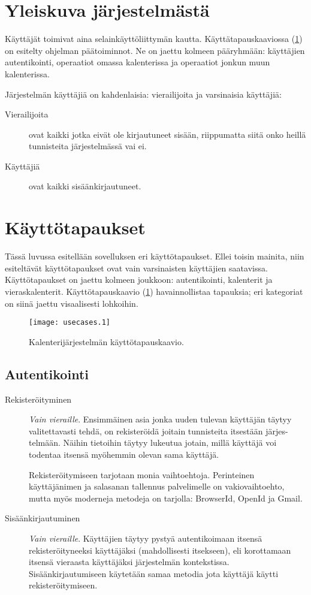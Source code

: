\documentclass[a4paper,12pt]{report}
\begin{document}
\section{Yleiskuva järjestelmästä}
Käyttäjät toimivat aina selainkäyttöliittymän kautta. Käyttätapauskaaviossa
(\ref{graph_usecases}) on esitelty ohjelman päätoiminnot. Ne on jaettu kolmeen
pääryhmään: käyttäjien autentikointi, operaatiot omassa kalenterissa ja
operaatiot jonkun muun kalenterissa.

Järjestelmän käyttäjiä on kahdenlaisia: vierailijoita ja varsinaisia
käyttäjiä:
\begin{description}
   \item[Vierailijoita] ovat kaikki jotka eivät ole kirjautuneet sisään,
      riippumatta siitä onko heillä tunnisteita järjestelmässä vai ei.
   \item[Käyttäjiä] ovat kaikki sisäänkirjautuneet.
\end{description}

\section{Käyttötapaukset}
Tässä luvussa esitellään sovelluksen eri käyttötapaukset.  Ellei toisin mainita,
niin esiteltävät käyttö\-tapaukset ovat vain varsinaisten käyttäjien saatavissa.
Käyttö\-tapaukset on jaettu kolmeen joukkoon: autentikointi, kalenterit ja
vieraskalenterit.  Käyttö\-tapaus\-kaavio (\ref{graph_usecases}) havainnollistaa
tapauksia; eri kategoriat on siinä jaettu visaalisesti lohkoihin.
\begin{figure}[ht]
   \centering \texttt{[image: usecases.1]}
   \caption{Kalenterijärjestelmän käyttötapauskaavio.}
   \label{graph_usecases}
\end{figure}

\subsection{Autentikointi}
\begin{description}
   \item[Rekisteröityminen]  \emph{Vain vieraille}. Ensimmäinen asia jonka uuden
      tulevan käyt\-täjän täytyy valitettavasti tehdä, on rekisteröidä joitain
      tunnisteita itsestään järjes-telmään.  Näihin tietoihin täytyy lukeutua
      jotain, millä käyttäjä voi todentaa itsensä myöhemmin olevan sama
      käyttäjä.

      Rekisteröitymiseen tarjotaan monia vaihtoehtoja. Perinteinen käyttäjänimen
      ja salasanan tallennus palvelimelle on vakiovaihtoehto, mutta myös
      moderneja metodeja on tarjolla: BrowserId, OpenId ja Gmail. 

   \item[Sisäänkirjautuminen]  \emph{Vain vieraille}. Käyttäjien täytyy pystyä
      autentikoimaan itsensä rekiste\-röityneeksi käyttäjäksi (mahdollisesti
      itsekseen), eli korottamaan itsensä vieraasta käyttäjäksi järjestelmän
      kontekstissa.  Sisäänkirjautumiseen käy\-tetään samaa metodia jota
      käyttäjä käytti rekisteröitymiseen.
\end{description}
\end{document}

